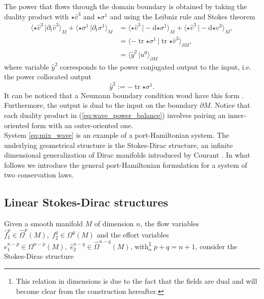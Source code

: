 \documentclass{elsarticle}
\newcommand{\revOne}[1]{{\color{black}#1}}
\renewcommand\d{\ensuremath{\mathrm{d}}}
\DeclareMathOperator{\tr}{tr}
\newcommand*{\dual}[1]{\ensuremath{\widehat{#1}}}
\newcommand{\dualpr}[3][]{\ensuremath{\langle #2 \, \vert #3 \rangle_{#1}}}
\begin{document}
{The power that flows through the domain boundary is obtained by taking the duality product with $\star \dual{v}^3$ and $\star \sigma^1$ and using the Leibniz rule and  Stokes theorem
\begin{equation}
	\label{eq:wave_power_balance}
\begin{aligned}
    \dualpr[M]{\star \dual{v}^3}{\partial_t \dual{v}^3} + \dualpr[M]{\star \sigma^1}{\partial_t \sigma^1} &= \dualpr[M]{\star \dual{v}^3}{-\d {\star \sigma^1}} + \dualpr[M]{\star \dual{v}^3}{-\d {\star v^3}}, \\
    &= \dualpr[\partial M]{-\tr {\star \sigma^1}}{\tr {\star \dual{v}^3}}, \\
    &= \dualpr[\partial M]{\dual{y}^2}{u^0}
\end{aligned}
\end{equation}
where variable $\dual{y}^2$ corresponds to the power conjugated output to the input, i.e. the power collocated output
\begin{equation}
    \dual{y}^2 := -\tr {\star \sigma^1}.
\end{equation}
It can be noticed that a Neumann  boundary condition woud have this form \cite{arnold2018finite}. Furthermore, the output is dual to the input on the boundary $\partial M$.
Notice that each duality product in (\ref{eq:wave_power_balance}) involves pairing an inner-oriented form with an outer-oriented one.\\

System \eqref{eq:mix_wave} is an example of a port-Hamiltonian system. The underlying geometrical structure is the Stokes-Dirac structure, an infinite dimensional generalization of Dirac manifolds introduced by Courant \cite{courant1990}. In what follows we introduce the general port-Hamiltonian formulation for a system of two conservation laws.
}


\subsection{Linear Stokes-Dirac structures}
Given a smooth manifold $M$ of dimension $n$, the \revOne{flow} variables $\dual{f}^p_1 \in \dual{\Omega}^p(M), \; {f}^q_2 \in \Omega^q(M)$ and the effort variables ${e}^{n-p}_1 \in \Omega^{n-p}(M), \; \dual{e}^{n-q}_2 \in \dual{\Omega}^{n-q}(M)$, with\footnote{This relation in dimensions is due to the fact that the fields are dual and will become clear from the construction hereafter.} $p+q=n+1$, consider the Stokes-Dirac structure
\end{document}
